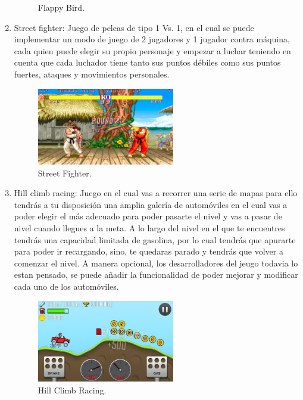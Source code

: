 \documentclass{article}
\begin{document}
\begin{enumerate}
\begin{figure}[h]
  \centering
  \caption{Flappy Bird.}
  \label{fig:flappy_bird}
  \end{figure}
  \item {Street fighter: } Juego de peleas de tipo 1 Vs. 1, en el cual se puede implementar un modo de juego de 2 jugadores y 1 jugador contra máquina, cada quien puede elegir  su propio personaje y empezar a luchar teniendo en cuenta que cada luchador tiene tanto sus puntos débiles como sus puntos fuertes, ataques y movimientos personales.
  \begin{figure}[h]
  \includegraphics[width=6cm]{street_fighter.jpg}
  \centering
  \caption{Street Fighter.}
  \label{fig:street_fighter}
  \end{figure}
  \item {Hill climb racing: }Juego en el cual vas a recorrer una serie de mapas para ello tendrás a tu disposición una amplia galería de automóviles en el cual vas a poder elegir el más adecuado para poder pasarte el nivel y vas a pasar de nivel cuando llegues a la meta. A lo largo del nivel en el que te encuentres tendrás una capacidad limitada de gasolina, por lo cual tendrás que apurarte para poder ir recargando, sino, te quedaras parado y tendrás que volver a comenzar el nivel. A manera opcional, los desarrolladores del jeugo todavia lo estan pensado, se puede añadir la funcionalidad de poder mejorar y modificar cada uno de los automóviles.
   \begin{figure}[h]
  \includegraphics[width=6cm]{hill_climb_racing.jpg}
  \centering
  \caption{Hill Climb Racing.}
  \label{fig:hill_climb_racing}
  \end{figure}
\end{enumerate}


\end{document}
